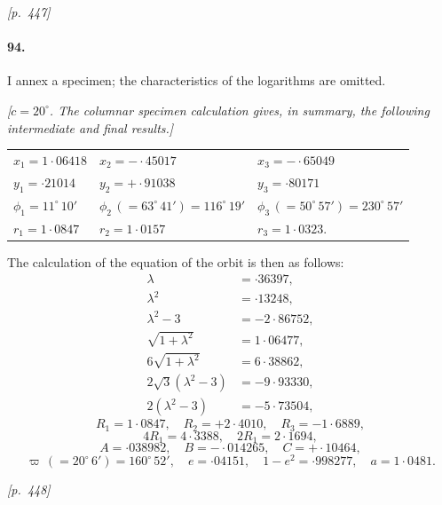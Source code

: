 \documentclass[11pt]{article}
\begin{document}
\medskip
\noindent\textit{[p.~447]}

\medskip

\paragraph{94.} I annex a specimen; the characteristics of the logarithms are omitted.

\smallskip

\noindent\textit{[$c = 20^{\circ}$. The columnar specimen calculation gives, in summary, the following intermediate and final results.]}

\smallskip

\begin{center}
\begin{tabular}{lll}
$x_{1} = 1{\cdot}06418$ & $x_{2} = -{\cdot}45017$ & $x_{3} = -{\cdot}65049$\\
$y_{1} = {\cdot}21014$ & $y_{2} = +{\cdot}91038$ & $y_{3} = {\cdot}80171$\\
$\phi_{1} = 11^{\circ}\,10'$ & $\phi_{2}\,(= 63^{\circ}\,41') = 116^{\circ}\,19'$ & $\phi_{3}\,(= 50^{\circ}\,57') = 230^{\circ}\,57'$\\
$r_{1} = 1{\cdot}0847$ & $r_{2} = 1{\cdot}0157$ & $r_{3} = 1{\cdot}0323.$\\
\end{tabular}
\end{center}

The calculation of the equation of the orbit is then as follows:
\[
\begin{aligned}
\lambda &= {\cdot}36397,\\
\lambda^{2} &= {\cdot}13248,\\
\lambda^{2} - 3 &= -2{\cdot}86752,\\
\sqrt{1 + \lambda^{2}} &= 1{\cdot}06477,\\
6\sqrt{1 + \lambda^{2}} &= 6{\cdot}38862,\\
2\sqrt{3}(\lambda^{2} - 3) &= -9{\cdot}93330,\\
2(\lambda^{2} - 3) &= -5{\cdot}73504,
\end{aligned}
\]
\[
R_{1} = 1{\cdot}0847,\quad R_{2} = +2{\cdot}4010,\quad R_{3} = -1{\cdot}6889,
\]
\[
4R_{1} = 4{\cdot}3388,\quad 2R_{1} = 2{\cdot}1694,
\]
\[
A = {\cdot}038982,\quad B = -{\cdot}014265,\quad C = +{\cdot}10464,
\]
\[
\varpi\,(= 20^{\circ}\,6') = 160^{\circ}\,52',\quad e = {\cdot}04151,\quad 1 - e^{2} = {\cdot}998277,\quad a = 1{\cdot}0481.
\]

\medskip
\noindent\textit{[p.~448]}
\end{document}
